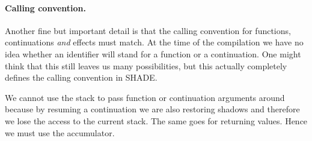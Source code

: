 \documentclass[class=article, crop=false]{standalone}
\begin{document}
\paragraph{Calling convention.}

Another fine but important detail is that the calling convention for functions,
continuations \emph{and} effects must match. At the time of the compilation we
have no idea whether an identifier will stand for a function or a continuation.
One might think that this still leaves us many possibilities, but this actually
completely defines the calling convention in SHADE.

We cannot use the stack to pass function or continuation arguments around
because by resuming a continuation we are also restoring shadows and therefore
we lose the access to the current stack. The same goes for returning values.
Hence we must use the accumulator.
\end{document}
